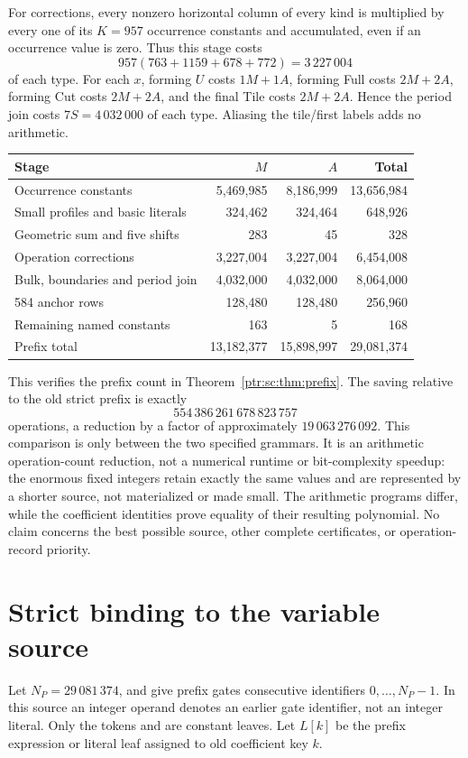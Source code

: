 \documentclass[11pt,letterpaper]{article}
\theoremstyle{definition}\newtheorem{definition}[theorem]{Definition}
\theoremstyle{remark}\newtheorem{remark}[theorem]{Remark}
\newcommand{\codem}[1]{\mbox{\normalfont\ttfamily\detokenize{#1}}}
\begin{document}
For corrections, every nonzero horizontal column of every kind is multiplied by every one of its $K=957$ occurrence constants and accumulated, even if an occurrence value is zero. Thus this stage costs
\[
 957(763+1159+678+772)=3\,227\,004
\]
of each type. For each $x$, forming $U$ costs $1M+1A$, forming Full costs $2M+2A$, forming Cut costs $2M+2A$, and the final Tile costs $2M+2A$. Hence the period join costs $7S=4\,032\,000$ of each type. Aliasing the tile/first labels adds no arithmetic.

\begin{center}\small
\begin{tabular}{@{}lrrr@{}}\toprule
Stage&$M$&$A$&Total\\\midrule
Occurrence constants&5,469,985&8,186,999&13,656,984\\
Small profiles and basic literals&324,462&324,464&648,926\\
Geometric sum and five shifts&283&45&328\\
Operation corrections&3,227,004&3,227,004&6,454,008\\
Bulk, boundaries and period join&4,032,000&4,032,000&8,064,000\\
584 anchor rows&128,480&128,480&256,960\\
Remaining named constants&163&5&168\\\midrule
Prefix total&13,182,377&15,898,997&29,081,374\\\bottomrule
\end{tabular}\end{center}
This verifies the prefix count in Theorem~\ref{ptr:sc:thm:prefix}. The saving relative to the old strict prefix is exactly
\[
 554\,386\,261\,678\,823\,757
\]
operations, a reduction by a factor of approximately $19\,063\,276\,092$. This comparison is only between the two specified grammars. It is an arithmetic operation-count reduction, not a numerical runtime or bit-complexity speedup: the enormous fixed integers retain exactly the same values and are represented by a shorter source, not materialized or made small. The arithmetic programs differ, while the coefficient identities prove equality of their resulting polynomial. No claim concerns the best possible source, other complete certificates, or operation-record priority.

\section{Strict binding to the variable source}\label{ptr:sc:sec:splice}
Let $N_P=29\,081\,374$, and give prefix gates consecutive identifiers $0,\ldots,N_P-1$. In this source an integer operand denotes an earlier gate identifier, not an integer literal. Only the tokens \codem{one} and \codem{three} are constant leaves. Let $L[k]$ be the prefix expression or literal leaf assigned to old coefficient key $k$.
\end{document}
